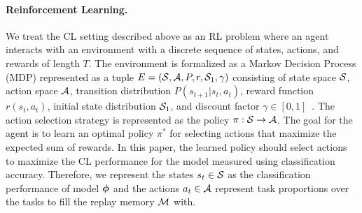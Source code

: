\paragraph{Reinforcement Learning.} We treat the CL setting described above as an RL problem where an agent interacts with an environment with a discrete sequence of states, actions, and rewards of length $T$. The environment is formalized as a Markov Decision Process (MDP) represented as a tuple $E = ({\mathcal{S}}, {\mathcal{A}}, P, r, {\mathcal{S}}_1, \gamma)$ consisting of state space ${\mathcal{S}}$, action space ${\mathcal{A}}$, transition distribution $P(s_{t+1}| s_{t}, a_{t})$, reward function $r(s_{t}, a_{t})$, initial state distribution ${\mathcal{S}}_1$, and discount factor $\gamma \in [0, 1]$~. The action selection strategy is represented as the policy $\pi: {\mathcal{S}} \rightarrow {\mathcal{A}}$. The goal for the agent is to learn an optimal policy $\pi^{*}$ for selecting actions that maximize the expected sum of rewards. In this paper, the learned policy should select actions to maximize the CL performance for the model measured using classification accuracy. Therefore, we represent the states $s_{t} \in {\mathcal{S}}$ as the classification performance of model ${\bm{\phi}}$ and the actions $a_{t} \in {\mathcal{A}}$ represent task proportions over the tasks to fill the replay memory ${\mathcal{M}}$ with.  


